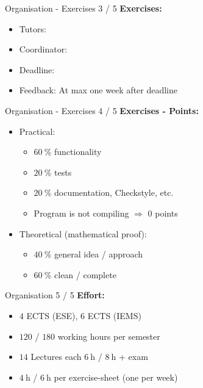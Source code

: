 \begin{frame}{Organisation - Exercises 3 / 5}
  \textbf{Exercises:}
  \begin{itemize}
    \item
      Tutors: \LectureOrganisationTutors
    \item
      Coordinator: \LectureOrganisationAdditional
    \item
      Deadline: \LectureOrganisationExercisesWorkingTime
    \item
      Feedback: At max one week after deadline
  \end{itemize}
\end{frame}


\begin{frame}{Organisation - Exercises 4 / 5}
  \textbf{Exercises - Points:}
  \begin{itemize}
    \item
    Practical:
    \begin{itemize}
      \item
        {\color{Mittel-Blau}$\SI{60}{\percent}$} functionality
      \item
        {\color{Mittel-Blau}$\SI{20}{\percent}$} tests 
      \item
        {\color{Mittel-Blau}$\SI{20}{\percent}$} documentation, Checkstyle, etc.
      \item
        {\color{Mittel-Gruen}Program is not compiling}
        $\Rightarrow$
        {\color{Mittel-Gruen}0 points}
    \end{itemize}
    \item
    Theoretical (mathematical proof):
    \begin{itemize}
      \item
        {\color{Mittel-Blau}$\SI{40}{\percent}$} general idea / approach
      \item
        {\color{Mittel-Blau}$\SI{60}{\percent}$} clean / complete
    \end{itemize}
  \end{itemize}
\end{frame}


\begin{frame}{Organisation 5 / 5}
  \textbf{Effort:}
  \begin{itemize}
    \item
      {\color{Mittel-Blau}$\num{4}$ ECTS} (ESE),
      {\color{Mittel-Blau}$\num{6}$ ECTS} (IEMS)
    \item
      {\color{Mittel-Blau}$\num{120}$} /
      {\color{Mittel-Blau}$\num{180}$}
      working hours per semester
    \item
      {\color{Mittel-Blau}$\num{14}$} Lectures each
      {\color{Mittel-Blau}$\SI{6}{\hour}$} /
      {\color{Mittel-Blau}$\SI{8}{\hour}$} + exam
    \item
      {\color{Mittel-Blau}$\SI{4}{\hour}$} /
      {\color{Mittel-Blau}$\SI{6}{\hour}$} per exercise-sheet (one per week)
  \end{itemize}
\end{frame}